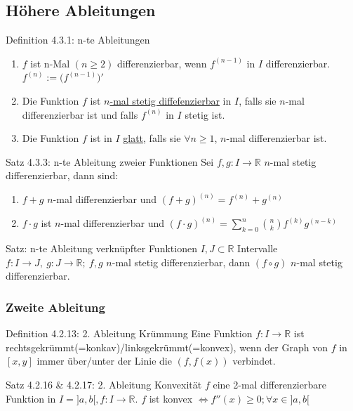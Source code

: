 \documentclass[a4paper,10pt]{article}
\begin{document}
\subsection{Höhere Ableitungen}
\begin{defbox}
    {Definition 4.3.1: n-te Ableitungen}
    \begin{enumerate}
        \item $f$ ist n-Mal $(n\ge 2)$ differenzierbar, wenn $f^{(n-1)}$ in $I$ differenzierbar. $f^{(n)}:=\big(f^{(n-1)}\big)'$
        \item Die Funktion $f$ ist \underline{$n$-mal stetig diffefenzierbar} in $I$, falls sie $n$-mal differenzierbar ist und falls $f^{(n)}$ in $I$ stetig ist.
        \item Die Funktion $f$ ist in $I$ \underline{glatt}, falls sie $\forall n\ge 1$, $n$-mal differenzierbar ist.
    \end{enumerate}
\end{defbox}
\begin{tbox}
    {Satz 4.3.3: n-te Ableitung zweier Funktionen}
    Sei $f,g: I\longrightarrow \mathbb R$ $n$-mal stetig differenzierbar, dann sind:
    \begin{enumerate}
        \item $f+g$ $n$-mal differenzierbar und $(f+g)^{(n)}=f^{(n)}+g^{(n)}$
        \item  $f\cdot g$ ist $n$-mal differenzierbar und $(f\cdot g)^{(n)}=\sum_{k=0}^n\binom{n}{k}f^{(k)}g^{(n-k)}$
    \end{enumerate}
\end{tbox}
\begin{tbox}
    {Satz: n-te Ableitung verknüpfter Funktionen}
    $I,J\subset \mathbb R$ Intervalle $f: I\longrightarrow J,\ g: J\longrightarrow \mathbb R;\ f,g$ $n$-mal stetig differenzierbar, dann $(f\circ g)$ $n$-mal stetig differenzierbar.
\end{tbox}
\subsubsection{Zweite Ableitung}
\begin{defbox}
    {Definition 4.2.13: 2. Ableitung Krümmung}
    Eine Funktion $f:I\longrightarrow\mathbb R$ ist rechtsgekrümmt(=konkav)/linksgekrümmt(=konvex), wenn der Graph von $f$ in $[x,y]$ immer über/unter der Linie die $(f,f(x))$ verbindet.
\end{defbox}
\begin{tbox}
    {Satz 4.2.16 \& 4.2.17: 2. Ableitung Konvexität}
    $f$ eine 2-mal differenzierbare Funktion in $I=]a,b[, f:I\longrightarrow\mathbb R$. $f$ ist konvex $\iff f''(x)\ge 0; \forall x\in ]a,b[$
\end{tbox}
\end{document}
